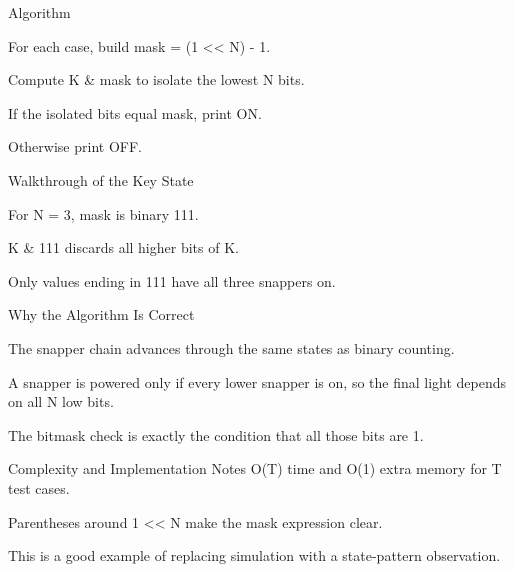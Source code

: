 \documentclass[aspectratio=169,11pt]{beamer}
\begin{document}
\begin{frame}{Algorithm}
\begin{tightitemize}
  \item For each case, build mask = (1 << N) - 1.
  \item Compute K \& mask to isolate the lowest N bits.
  \item If the isolated bits equal mask, print ON.
  \item Otherwise print OFF.
\end{tightitemize}
\end{frame}

\begin{frame}{Walkthrough of the Key State}
\begin{tightitemize}
  \item For N = 3, mask is binary 111.
  \item K \& 111 discards all higher bits of K.
  \item Only values ending in 111 have all three snappers on.
\end{tightitemize}
\end{frame}

\begin{frame}{Why the Algorithm Is Correct}
\begin{tightitemize}
  \item The snapper chain advances through the same states as binary counting.
  \item A snapper is powered only if every lower snapper is on, so the final light depends on all N low bits.
  \item The bitmask check is exactly the condition that all those bits are 1.
\end{tightitemize}
\end{frame}

\begin{frame}{Complexity and Implementation Notes}
\small
{} O(T) time and O(1) extra memory for T test cases.

\vspace{0.3cm}
\begin{tightitemize}
  \item Parentheses around 1 << N make the mask expression clear.
  \item This is a good example of replacing simulation with a state-pattern observation.
\end{tightitemize}
\end{frame}
\end{document}
